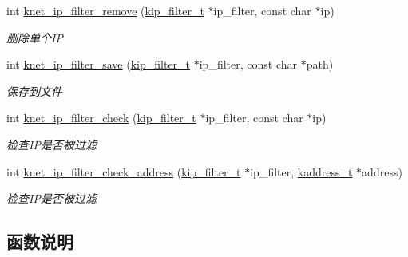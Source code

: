 \begin{DoxyCompactItemize}
int \hyperlink{a00112_gae03dc5307ec374e375c2313d27dd08ad_gae03dc5307ec374e375c2313d27dd08ad}{knet\+\_\+ip\+\_\+filter\+\_\+remove} (\hyperlink{a00054_a1c0c604eecd86fc8895cf4bbbba566af_a1c0c604eecd86fc8895cf4bbbba566af}{kip\+\_\+filter\+\_\+t} $\ast$ip\+\_\+filter, const char $\ast$ip)
\begin{DoxyCompactList}\small\item\em 删除单个\+I\+P \end{DoxyCompactList}\item 
int \hyperlink{a00112_ga1425a397cc96d8a1cdf32bff3f1fe645_ga1425a397cc96d8a1cdf32bff3f1fe645}{knet\+\_\+ip\+\_\+filter\+\_\+save} (\hyperlink{a00054_a1c0c604eecd86fc8895cf4bbbba566af_a1c0c604eecd86fc8895cf4bbbba566af}{kip\+\_\+filter\+\_\+t} $\ast$ip\+\_\+filter, const char $\ast$path)
\begin{DoxyCompactList}\small\item\em 保存到文件 \end{DoxyCompactList}\item 
int \hyperlink{a00112_ga6d722330898e2a29a8555d711aab8b01_ga6d722330898e2a29a8555d711aab8b01}{knet\+\_\+ip\+\_\+filter\+\_\+check} (\hyperlink{a00054_a1c0c604eecd86fc8895cf4bbbba566af_a1c0c604eecd86fc8895cf4bbbba566af}{kip\+\_\+filter\+\_\+t} $\ast$ip\+\_\+filter, const char $\ast$ip)
\begin{DoxyCompactList}\small\item\em 检查\+I\+P是否被过滤 \end{DoxyCompactList}\item 
int \hyperlink{a00112_gaa42afdd4af32db13227e991ad457f229_gaa42afdd4af32db13227e991ad457f229}{knet\+\_\+ip\+\_\+filter\+\_\+check\+\_\+address} (\hyperlink{a00054_a1c0c604eecd86fc8895cf4bbbba566af_a1c0c604eecd86fc8895cf4bbbba566af}{kip\+\_\+filter\+\_\+t} $\ast$ip\+\_\+filter, \hyperlink{a00054_a44e99fab0348ec54cfee119ddd9ceed6_a44e99fab0348ec54cfee119ddd9ceed6}{kaddress\+\_\+t} $\ast$address)
\begin{DoxyCompactList}\small\item\em 检查\+I\+P是否被过滤 \end{DoxyCompactList}\end{DoxyCompactItemize}


\subsection{函数说明}
\hypertarget{a00112_ga271a51fad46aa61d322b6c9da2d5ba1e_ga271a51fad46aa61d322b6c9da2d5ba1e}{}
